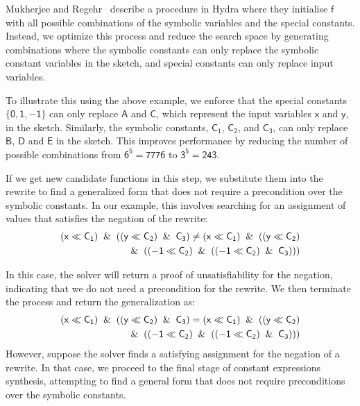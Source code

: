 \documentclass[review, anonymous, acmsmall]{acmart}
\newcommand{\inline}[1]{$\mathsf{#1}$}
\begin{document}
Mukherjee and Regehr~\cite{mukherjee_hydra_2024} describe a procedure in Hydra where they initialise \inline{f} with all possible combinations of the symbolic variables and the special constants. Instead, we optimize this process and reduce the search space by generating combinations where the symbolic constants can only replace the symbolic constant variables in the sketch, and special constants can only replace input variables. 

To illustrate this using the above example, we enforce that the special constants \inline{\{0, 1, -1\}} can only replace \inline{A} and \inline{C}, which represent the input variables \inline{x} and \inline{y}, in the sketch. Similarly, the symbolic constants, \inline{C_1}, \inline{C_2}, and \inline{C_3}, can only replace \inline{B}, \inline{D} and \inline{E} in the sketch. This improves performance by reducing the number of possible combinations from \inline{6^5 = 7776} to \inline{3^5 = 243}. 

If we get new candidate functions in this step, we substitute them into the rewrite to find a generalized form that does not require a precondition over the symbolic constants. In our example, this involves searching for an assignment of values that satisfies the negation of the rewrite:
\begin{align*}
\mathsf{
(x \ll C_1) \And ((y \ll C_2) \And C_3) \neq (x \ll C_1)  \And ((y \ll C_2)} \\ 
\mathsf{\And ((-1 \ll C_2) \And ((-1 \ll C_2) \And C_3)))}
\end{align*}

In this case, the solver will return a proof of unsatisfiability for the negation, indicating that we do not need a precondition for the rewrite. We then terminate the process and return the generalization as:
\begin{align*}
\mathsf{
(x \ll C_1) \And ((y \ll C_2) \And C_3) = (x \ll C_1)  \And ((y \ll C_2)} \\ 
\mathsf{\And ((-1 \ll C_2) \And ((-1 \ll C_2) \And C_3)))}
\end{align*}
However, suppose the solver finds a satisfying assignment for the negation of a rewrite. In that case, we proceed to the final stage of constant expressions synthesis, attempting to find a general form that does not require preconditions over the symbolic constants.

\label{enumerative}
\end{document}
